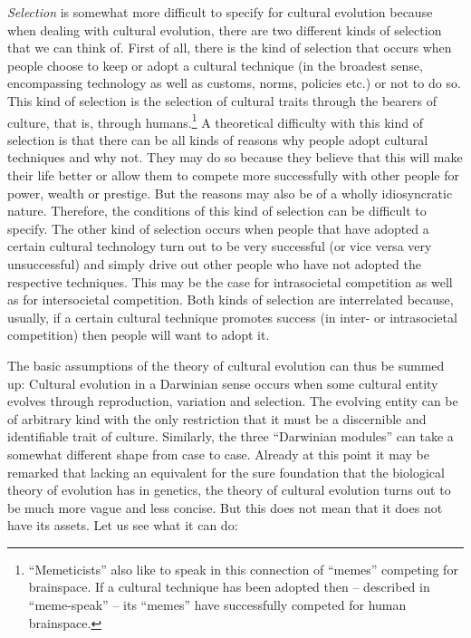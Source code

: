 {\em Selection} is somewhat more difficult to specify for cultural evolution
because when dealing with cultural evolution, there are two different kinds of
selection that we can think of. First of all, there is the kind of selection
that occurs when people choose to keep or adopt a cultural technique (in the
broadest sense, encompassing technology as well as customs, norms, policies
etc.) or not to do so. This kind of selection is the selection of cultural
traits through the bearers of culture, that is, through
humans.\footnote{``Memeticists'' also like to speak in this connection of
  ``memes'' competing for brainspace. If a cultural technique has been adopted
  then -- described in ``meme-speak'' -- its ``memes'' have successfully
  competed for human brainspace.} A theoretical difficulty with this kind of
selection is that there can be all kinds of reasons why people adopt cultural
techniques and why not. They may do so because they believe that this will
make their life better or allow them to compete more successfully with other
people for power, wealth or prestige. But the reasons may also be of a wholly
idiosyncratic nature.  Therefore, the conditions of this kind of selection can
be difficult to specify. The other kind of selection occurs when people that
have adopted a certain cultural technology turn out to be very successful (or
vice versa very unsuccessful) and simply drive out other people who have not
adopted the respective techniques. This may be the case for intrasocietal
competition as well as for intersocietal competition. Both kinds of selection
are interrelated because, usually, if a certain cultural technique promotes
success (in inter- or intrasocietal competition) then people will want to
adopt it.

The basic assumptions of the theory of cultural evolution can thus be summed
up: Cultural evolution in a Darwinian sense occurs when some cultural entity
evolves through reproduction, variation and selection. The evolving entity can
be of arbitrary kind with the only restriction that it must be a discernible
and identifiable trait of culture. Similarly, the three ``Darwinian modules''
can take a somewhat different shape from case to case. Already at this point
it may be remarked that lacking an equivalent for the sure foundation that the
biological theory of evolution has in genetics, the theory of cultural
evolution turns out to be much more vague and less concise. But this does not
mean that it does not have its assets. Let us see what it can do:

